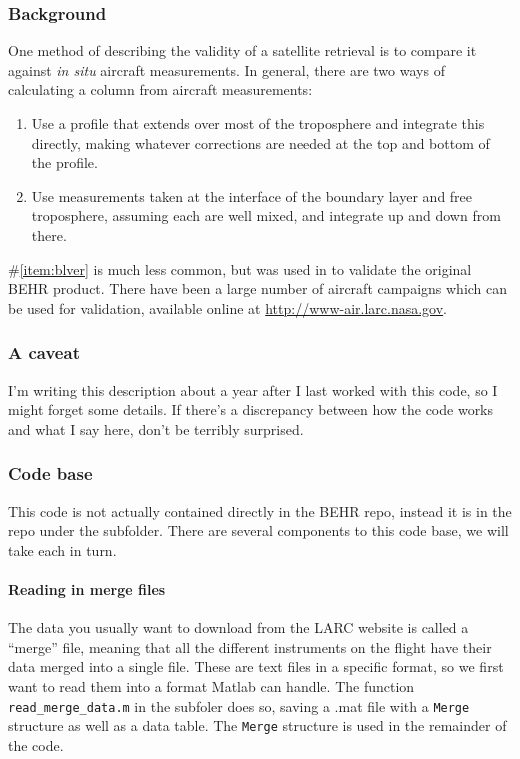 \documentclass[12pt]{article}
\begin{document}
		\subsubsection{Background}
		One method of describing the validity of a satellite retrieval is to compare it against \emph{in situ} aircraft measurements. In general, there are two ways of calculating a column from aircraft measurements:
		\begin{enumerate}
		\item Use a profile that extends over most of the troposphere and integrate this directly, making whatever corrections are needed at the top and bottom of the profile.
		\item \label{item:blver} Use measurements taken at the interface of the boundary layer and free troposphere, assuming each are well mixed, and integrate up and down from there.
		\end{enumerate}
		
		\#\ref{item:blver} is much less common, but was used in \citet{russell11} to validate the original BEHR product.  There have been a large number of aircraft campaigns which can be used for validation, available online at \url{http://www-air.larc.nasa.gov}.
		
		\subsubsection{A caveat}
		I'm writing this description about a year after I last worked with this code, so I might forget some details. If there's a discrepancy between how the code works and what I say here, don't be terribly surprised.
		
		\subsubsection{Code base}
		This code is not actually contained directly in the BEHR repo, instead it is in the  repo under the  subfolder. There are several components to this code base, we will take each in turn.

		\paragraph{Reading in merge files}
		
		The data you usually want to download from the LARC website is called a ``merge'' file, meaning that all the different instruments on the flight have their data merged into a single file. These are text files in a specific format, so we first want to read them into a format Matlab can handle.  The function \lstinline$read_merge_data.m$ in the  subfoler does so, saving a .mat file with a \lstinline$Merge$ structure as well as a data table. The \lstinline$Merge$ structure is used in the remainder of the code.
		
\end{document}
